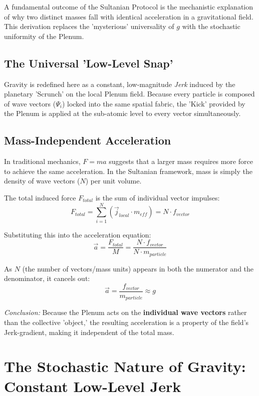 \documentclass[11pt]{article}
\begin{document}
A fundamental outcome of the Sultanian Protocol is the mechanistic explanation of why two distinct masses fall with identical acceleration in a gravitational field. This derivation replaces the 'mysterious' universality of $g$ with the stochastic uniformity of the Plenum.

\subsection{The Universal 'Low-Level Snap'}
Gravity is redefined here as a constant, low-magnitude \textit{Jerk} induced by the planetary 'Scrunch' on the local Plenum field. Because every particle is composed of wave vectors ($\Psi_i$) locked into the same spatial fabric, the 'Kick' provided by the Plenum is applied at the sub-atomic level to every vector simultaneously.

\subsection{Mass-Independent Acceleration}
In traditional mechanics, $F=ma$ suggests that a larger mass requires more force to achieve the same acceleration. In the Sultanian framework, mass is simply the density of wave vectors ($N$) per unit volume. 

The total induced force $F_{total}$ is the sum of individual vector impulses:
\begin{equation}
    F_{total} = \sum_{i=1}^{N} (\vec{j}_{local} \cdot m_{eff}) = N \cdot f_{vector}
\end{equation}

Substituting this into the acceleration equation:
\begin{equation}
    \vec{a} = \frac{F_{total}}{M} = \frac{N \cdot f_{vector}}{N \cdot m_{particle}}
\end{equation}

As $N$ (the number of vectors/mass units) appears in both the numerator and the denominator, it cancels out:
\begin{equation}
    \vec{a} = \frac{f_{vector}}{m_{particle}} \approx g
\end{equation}

\textit{Conclusion:} Because the Plenum acts on the \textbf{individual wave vectors} rather than the collective 'object,' the resulting acceleration is a property of the field's Jerk-gradient, making it independent of the total mass.


\section{The Stochastic Nature of Gravity: Constant Low-Level Jerk}
\end{document}
